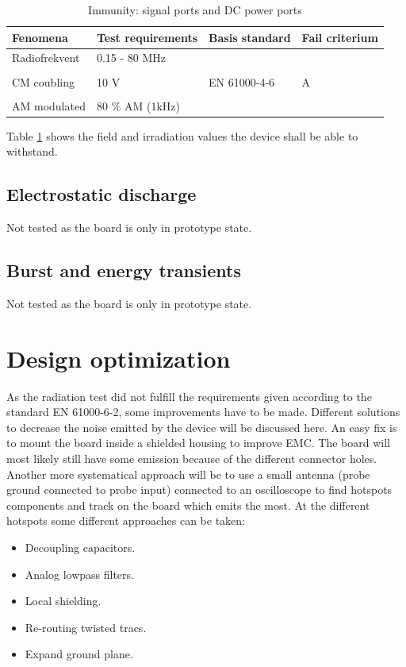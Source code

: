 \begin{table}[H]
		\begin{center}
		\begin{tabular}{|l|l|l|l|}\hline
			Fenomena 		& Test requirements		& Basis standard 	& Fail criterium	\\\hline
			Radiofrekvent		& 0.15 - 80 MHz		& 				& 			\\
							&					&				&			\\
			CM coubling		& 10 V				& EN 61000-4-6	& A			\\
							&					&				&			\\
			AM modulated		& 80 \% AM (1kHz)		& 				&			\\\hline
		\end{tabular}
		\end{center}
	\caption{Immunity: signal ports and DC power ports}
	\label{tab:signal_dc_power}
\end{table}
Table \ref{tab:signal_dc_power} shows the field and irradiation values the device shall be able to withstand. 
\subsection{Electrostatic discharge}
Not tested as the board is only in prototype state.

\subsection{Burst and energy transients}
Not tested as the board is only in prototype state.

\section{Design optimization}\label{sec:design_optimization}
As the radiation test did not fulfill the requirements given according to the standard EN 61000-6-2, some improvements have to be made. Different solutions to decrease the noise emitted by the device will be discussed here.
\p An easy fix is to mount the board inside a shielded housing to improve EMC. The board will most likely still have some emission because of the different connector holes.
\p Another more systematical approach will be to use a small antenna (probe ground connected to probe input) connected to an oscilloscope to find hotspots components and track on the board which emits the most. At the different hotspots some different approaches can be taken:
\begin{itemize}
	\item Decoupling capacitors.
	\item Analog lowpass filters.
	\item Local shielding.
	\item Re-routing twisted tracs.
	\item Expand ground plane.
\end{itemize} 





